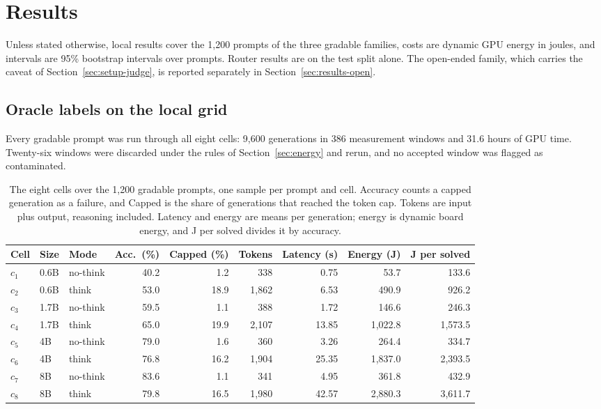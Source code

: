 \documentclass[final,5p,times,twocolumn]{elsarticle}
\theoremstyle{plain}
\begin{document}
\section{Results}
\label{sec:results}

Unless stated otherwise, local results cover the 1{,}200 prompts of the three
gradable families, costs are dynamic GPU energy in joules, and intervals are
95\% bootstrap intervals over prompts. Router results are on the test split
alone. The open-ended family, which carries the caveat of
Section~\ref{sec:setup-judge}, is reported separately in
Section~\ref{sec:results-open}.

\subsection{Oracle labels on the local grid}
\label{sec:results-labels}

Every gradable prompt was run through all eight cells: 9{,}600 generations in
386 measurement windows and 31.6 hours of GPU time. Twenty-six windows were
discarded under the rules of Section~\ref{sec:energy} and rerun, and no
accepted window was flagged as contaminated.

\begin{table}[ht]
\centering
\small
\caption{The eight cells over the 1{,}200 gradable prompts, one sample per
prompt and cell. Accuracy counts a capped generation as a failure, and Capped
is the share of generations that reached the token cap. Tokens are input plus
output, reasoning included. Latency and energy are means per generation;
energy is dynamic board energy, and J per solved divides it by accuracy.}
\label{tab:cells}
\begin{tabular}{@{}lllrrrrrr@{}}
\toprule
Cell & Size & Mode & Acc.\ (\%) & Capped (\%) & Tokens & Latency (s) & Energy (J) & J per solved \\
\midrule
$c_1$ & 0.6B & no-think & 40.2 & 1.2 & 338 & 0.75 & 53.7 & 133.6 \\
$c_2$ & 0.6B & think & 53.0 & 18.9 & 1{,}862 & 6.53 & 490.9 & 926.2 \\
$c_3$ & 1.7B & no-think & 59.5 & 1.1 & 388 & 1.72 & 146.6 & 246.3 \\
$c_4$ & 1.7B & think & 65.0 & 19.9 & 2{,}107 & 13.85 & 1{,}022.8 & 1{,}573.5 \\
$c_5$ & 4B & no-think & 79.0 & 1.6 & 360 & 3.26 & 264.4 & 334.7 \\
$c_6$ & 4B & think & 76.8 & 16.2 & 1{,}904 & 25.35 & 1{,}837.0 & 2{,}393.5 \\
$c_7$ & 8B & no-think & 83.6 & 1.1 & 341 & 4.95 & 361.8 & 432.9 \\
$c_8$ & 8B & think & 79.8 & 16.5 & 1{,}980 & 42.57 & 2{,}880.3 & 3{,}611.7 \\
\bottomrule
\end{tabular}

\end{table}
\end{document}
